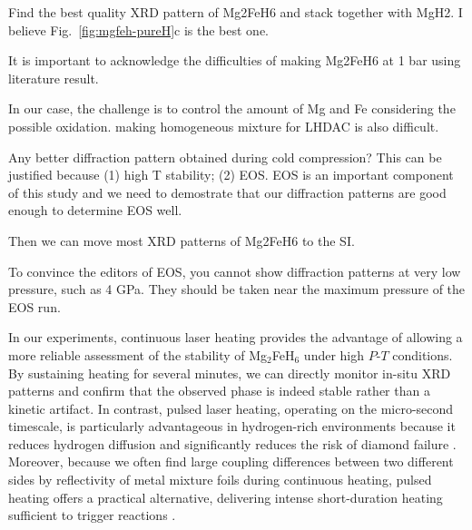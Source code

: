 \documentclass[draft,jgrga,12pt]{agujournal2019}
\begin{document}
\begin{cbox}
Find the best quality XRD pattern of Mg2FeH6 and stack together with MgH2.  I believe Fig.~\ref{fig:mgfeh-pureH}c is the best one.

It is important to acknowledge the difficulties of making Mg2FeH6 at 1 bar using literature result.  

In our case, the challenge is to control the amount of Mg and Fe considering the possible oxidation.  making homogeneous mixture for LHDAC is also difficult.\\


Any better diffraction pattern obtained during cold compression?  This can be justified because (1) high T stability; (2) EOS.
EOS is an important component of this study and we need to demostrate that our diffraction patterns are good enough to determine EOS well.\\

Then we can move most XRD patterns of Mg2FeH6 to the SI.
\end{cbox}


\begin{cboxr}
[DS] To convince the editors of EOS, you cannot show diffraction patterns at very low pressure, such as 4 GPa. They should be taken near the maximum pressure of the EOS run.\\
\end{cboxr}


In our experiments, continuous laser heating provides the advantage of allowing a more reliable assessment of the stability of Mg$_2$FeH$_6$ under high $P$-$T$ conditions. 
By sustaining heating for several minutes, we can directly monitor in-situ XRD patterns and confirm that the observed phase is indeed stable rather than a kinetic artifact.
In contrast, pulsed laser heating, operating on the micro-second timescale, is particularly advantageous in hydrogen-rich environments because it reduces hydrogen diffusion and significantly reduces the risk of diamond failure \cite{goncharov_xray_2010,horn_building_2025}. 
Moreover, because  we often find large coupling differences between two different sides by reflectivity of metal mixture foils during continuous heating, pulsed heating offers a practical alternative, delivering intense short-duration heating sufficient to trigger reactions \cite{ning_mechanism_2019}.
\end{document}
